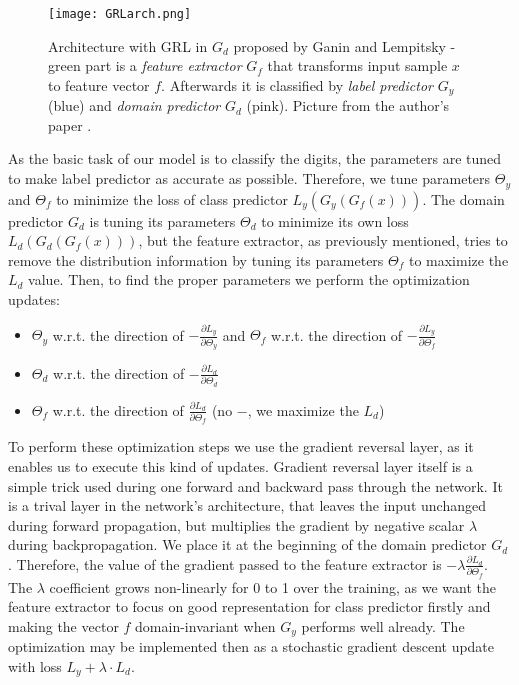 \documentclass[shortabstract, inz, english]{iithesis}
\begin{document}
\begin{figure}%
    \centering
    \texttt{[image: GRLarch.png]}%
    \caption{Architecture with GRL in $G_{d}$ proposed by Ganin and Lempitsky - green part is a \textit{feature extractor} $G_{f}$ that transforms input sample $x$ to feature vector $f$. Afterwards it is classified by \textit{label predictor} $G_{y}$ (blue) and \textit{domain predictor} $G_{d}$ (pink). Picture from the author's paper \cite{pmlr-v37-ganin15}.}
    \label{fig:GRLarch}%
\end{figure}
\par
As the basic task of our model is to classify the digits, the parameters are tuned to make label predictor as accurate as possible. Therefore, we tune parameters $\Theta_{y}$ and $\Theta_{f}$ to minimize the loss of class predictor $L_{y}( G_y( G_{f}( x )))$. The domain predictor $G_{d}$ is tuning its parameters $\Theta_{d}$ to minimize its own loss $L_{d}( G_d( G_{f}( x )))$, but the feature extractor, as previously mentioned, tries to remove the distribution information by tuning its parameters $\Theta_{f}$ to maximize the $L_{d}$ value. Then, to find the proper parameters we perform the optimization updates:
\begin{itemize}
    \item $\Theta_{y}$ w.r.t. the direction of $-\frac{\partial L_{y}}{\partial \Theta_{y}}$ and $\Theta_{f}$ w.r.t. the direction of $-\frac{\partial L_{y}}{\partial \Theta_{f}}$
    \item $\Theta_{d}$ w.r.t. the direction of $-\frac{\partial L_{d}}{\partial \Theta_{d}}$
    \item $\Theta_{f}$ w.r.t. the direction of $\frac{\partial L_{d}}{\partial \Theta_{f}}$ (no $-$, we maximize the $L_{d}$)
\end{itemize}
\par
To perform these optimization steps we use the gradient reversal layer, as it enables us to execute this kind of updates.
Gradient reversal layer itself is a simple trick used during one forward and backward pass through the network. It is a trival layer in the network's architecture, that leaves the input unchanged during forward propagation, but multiplies the gradient by negative scalar $\lambda$ during backpropagation. We place it at the beginning of the domain predictor $G_{d}$. Therefore, the value of the gradient passed to the feature extractor is $-\lambda \frac{\partial L_{d}}{\partial \Theta_{f}}$. The $\lambda$ coefficient grows non-linearly for 0 to 1 over the training, as we want the feature extractor to focus on good representation for class predictor firstly and making the vector $f$ domain-invariant when $G_{y}$ performs well already. The optimization may be implemented then as a stochastic gradient descent update with loss $L_{y} + \lambda \cdot L_{d}$. 
\end{document}

